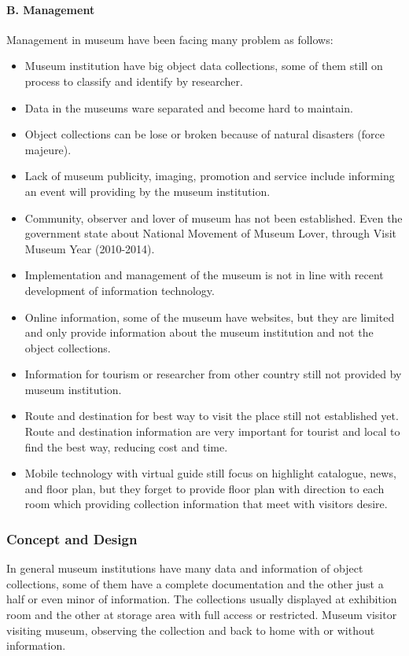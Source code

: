 \paragraph{B. Management} Management in museum have been facing many problem as follows:
\begin{itemize}
	\item Museum institution have big object data collections, some of them still on process to classify and identify by researcher.
	\item Data in the museums ware separated and become hard to maintain.
	\item Object collections can be lose or broken because of natural disasters (force majeure).
	\item Lack of museum publicity, imaging, promotion and service include informing an event will providing by the museum institution.
	\item Community, observer and lover of museum has not been established. Even the government state about National Movement of Museum Lover, through Visit Museum Year (2010-2014).
	\item Implementation and management of the museum is not in line with recent development of information technology.
	\item Online information, some of the museum have websites, but they are limited and only provide information about the museum institution and not the object collections.
	\item Information for tourism or researcher from other country still not provided by museum institution.
	\item Route and destination for best way to visit the place still not established yet. Route and destination information are very important for tourist and local to find the best way, reducing cost and time.
	\item Mobile technology with virtual guide still focus on highlight catalogue, news, and floor plan, but they forget to provide floor plan with direction to each room which providing collection information that meet with visitors desire.
\end{itemize}

\subsubsection{Concept and Design}

In general museum institutions have many data and information of object collections, some of them have a complete documentation and the other just a half or even minor of information. The collections usually displayed at exhibition room and the other at storage area with full access or restricted. Museum visitor visiting museum, observing the collection and back to home with or without information.

